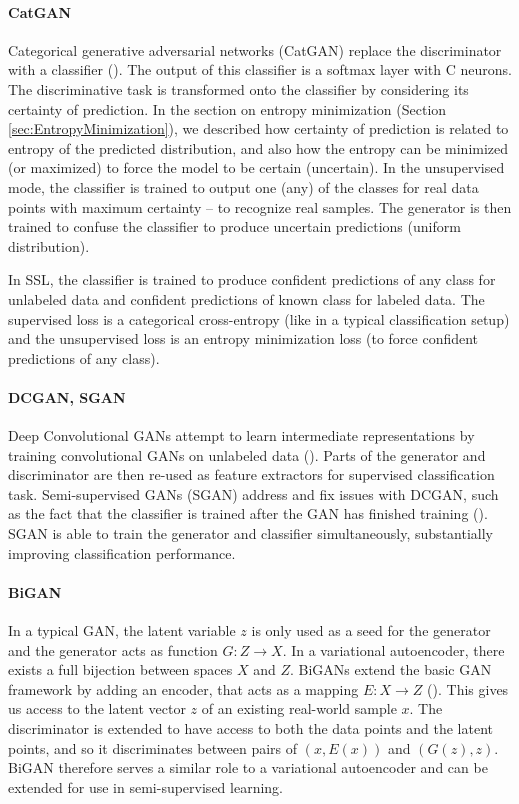 \paragraph*{CatGAN}
Categorical generative adversarial networks (CatGAN) replace the discriminator with a classifier (\cite{CatGAN}). The output of this classifier is a softmax layer with C neurons. The discriminative task is transformed onto the classifier by considering its certainty of prediction. In the section on entropy minimization (Section \ref{sec:EntropyMinimization}), we described how certainty of prediction is related to entropy of the predicted distribution, and also how the entropy can be minimized (or maximized) to force the model to be certain (uncertain). In the unsupervised mode, the classifier is trained to output one (any) of the classes for real data points with maximum certainty -- to recognize real samples. The generator is then trained to confuse the classifier to produce uncertain predictions (uniform distribution).

In SSL, the classifier is trained to produce confident predictions of any class for unlabeled data and confident predictions of known class for labeled data. The supervised loss is a categorical cross-entropy (like in a typical classification setup) and the unsupervised loss is an entropy minimization loss (to force confident predictions of any class).

\paragraph*{DCGAN, SGAN}
Deep Convolutional GANs attempt to learn intermediate representations by training convolutional GANs on unlabeled data (\cite{DCGAN}). Parts of the generator and discriminator are then re-used as feature extractors for supervised classification task. Semi-supervised GANs (SGAN) address and fix issues with DCGAN, such as the fact that the classifier is trained after the GAN has finished training (\cite{SGAN}). SGAN is able to train the generator and classifier simultaneously, substantially improving classification performance.

\paragraph*{BiGAN}
In a typical GAN, the latent variable $z$ is only used as a seed for the generator and the generator acts as function $G: Z \rightarrow X$. In a variational autoencoder, there exists a full bijection between spaces $X$ and $Z$. BiGANs extend the basic GAN framework by adding an encoder, that acts as a mapping $E: X \rightarrow Z$ (\cite{BiGAN}). This gives us access to the latent vector $z$ of an existing real-world sample $x$. The discriminator is extended to have access to both the data points and the latent points, and so it discriminates between pairs of $(x, E(x))$ and $(G(z), z)$. BiGAN therefore serves a similar role to a variational autoencoder and can be extended for use in semi-supervised learning.


